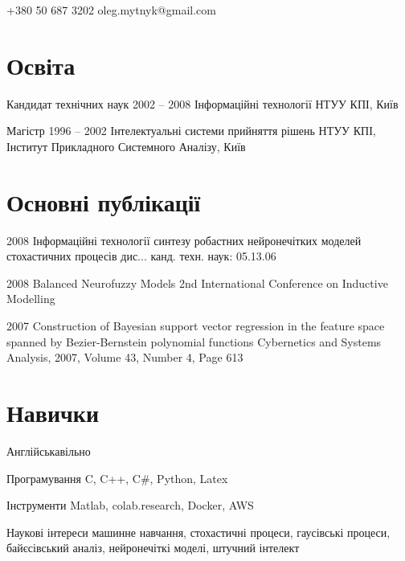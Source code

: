 \documentclass{tccv}
\begin{document}
    {+380 50 687 3202}
    {oleg.mytnyk@gmail.com}

\section{Освіта}

\begin{yearlist}

\item[Кандидат технічних наук]{2002 -- 2008}
     {Інформаційні технології}
     {НТУУ КПІ, Київ}

\item[Магістр]{1996 -- 2002}
     {Інтелектуальні системи прийняття рішень}
     {НТУУ КПІ, Інститут Прикладного Системного Аналізу, Київ}


\end{yearlist}


\section{Основні публікації}

\begin{yearlist}

\item{2008}
     {Інформаційні технології синтезу робастних нейронечітких моделей стохастичних процесів}     
     {дис... канд. техн. наук: 05.13.06}
\item{2008}
     {Balanced Neurofuzzy Models}
     {2nd International Conference on Inductive Modelling}

\item{2007}
     {Construction of Bayesian support vector regression in the feature space spanned by Bezier-Bernstein polynomial functions}
     {Cybernetics and Systems Analysis, 2007, Volume 43, Number 4, Page 613}

\end{yearlist}

\section{Навички}

\begin{factlist}

\item{Англійська}{вільно}
\item{Програмування}
     {C, C++, C\#, Python, Latex}

\item{Інструменти}
     {Matlab, colab.research, Docker, AWS}

\item{Наукові інтереси}
     {машинне навчання, стохастичні процеси, гаусівські процеси, байєсівський аналіз, нейронечіткі моделі, штучний інтелект}
\end{factlist}
\end{document}
